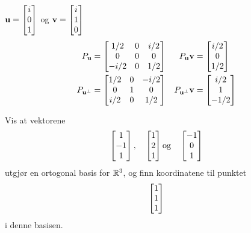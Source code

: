 \begin{losning}
\begin{punkt}
$\mathbf{u}=\begin{bmatrix} i \\ 0 \\ 1 \end{bmatrix}$ og $\mathbf{v}=\begin{bmatrix} i \\ 1 \\ 0 \end{bmatrix}$\\[4pt]
\vspace{-15pt}
\begin{align*}
P_{\mathbf{u}}
&=
\begin{bmatrix}
1/2  & 0 & i/2 \\
0    & 0 & 0   \\
-i/2 & 0 & 1/2
\end{bmatrix}
&
P_{\mathbf{u}} \mathbf{v} &= \begin{bmatrix} i/2 \\ 0 \\ 1/2 \end{bmatrix}
\\
P_{\mathbf{u}^\perp}
&=
\begin{bmatrix}
1/2  & 0 & -i/2 \\
0    & 1 & 0    \\
i/2  & 0 & 1/2
\end{bmatrix}
&
P_{\mathbf{u}^\perp} \mathbf{v} &= \begin{bmatrix} i/2 \\ 1 \\ -1/2 \end{bmatrix}
\end{align*}
\end{punkt}
\end{losning}


\begin{oppgave}
Vis at vektorene 
\[
\begin{bmatrix} 1 \\ -1 \\ 1 \end{bmatrix}, \quad \begin{bmatrix} 1 \\ 2 \\ 1 \end{bmatrix} \text{og} \quad \begin{bmatrix} -1 \\ 0 \\ 1 \end{bmatrix}
\]
utgjør en ortogonal basis for $\mathbb{R}^3$, og finn koordinatene til punktet
\[
\begin{bmatrix} 1 \\ 1 \\ 1 \end{bmatrix}
\]
i denne basisen.
\end{oppgave}



%
%
%

